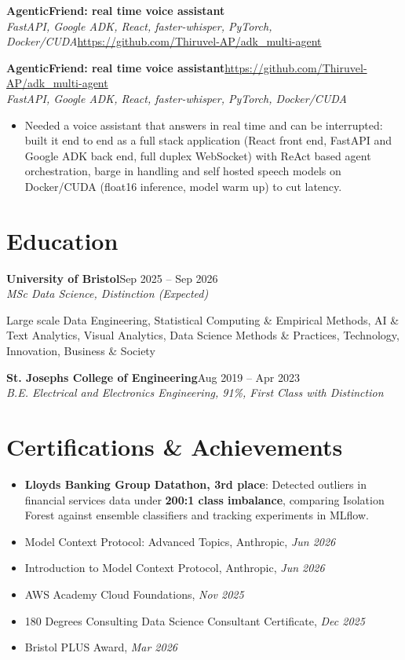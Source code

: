 \documentclass[a4paper,11pt]{article}
\newcommand{\roleNoLoc}[3]{\textbf{#1}\hfill{\color{muted}#2}\\ \textit{#3}\par}
\newcommand{\project}[3]{%
  \textbf{#1}\hfill#3\\ {\color{muted}\small\textit{#2}}\par}
\newcommand{\gap}{\vspace{5pt}}
\newcommand{\num}[1]{\textbf{#1}}   %
\begin{document}
\else
\textbf{AgenticFriend: real time voice assistant}\\ {\color{muted}\small\textit{FastAPI, Google ADK, React, faster-whisper, PyTorch, Docker/CUDA}}\hfill{\small\url{https://github.com/Thiruvel-AP/adk_multi-agent}}\par
\fi
\else
\project{AgenticFriend: real time voice assistant}{FastAPI, Google ADK, React, faster-whisper, PyTorch, Docker/CUDA}{\url{https://github.com/Thiruvel-AP/adk_multi-agent}}
\fi
\begin{itemize}
  \item Needed a voice assistant that answers in real time and can be interrupted: built it end to end as a full stack application (React front end, FastAPI and Google ADK back end, full duplex WebSocket) with ReAct based agent orchestration, barge in handling and self hosted speech models on Docker/CUDA (float16 inference, model warm up) to cut latency.
\end{itemize}

\section{Education}
\roleNoLoc{University of Bristol}{Sep 2025 – Sep 2026}{MSc Data Science, Distinction \textit{(Expected)}}
{\color{muted}\small Large scale Data Engineering, Statistical Computing \& Empirical Methods, AI \& Text Analytics, Visual Analytics, Data Science Methods \& Practices, Technology, Innovation, Business \& Society}\par
\gap
{}
\roleNoLoc{St. Joseph\textquotesingle{}s College of Engineering}{Aug 2019 – Apr 2023}{B.E. Electrical and Electronics Engineering, 91\%, First Class with Distinction}

\section{Certifications \& Achievements}
\begin{itemize}
  \item \textbf{Lloyd\textquotesingle{}s Banking Group Datathon, 3rd place}: Detected outliers in financial services data under \num{200:1 class imbalance}, comparing Isolation Forest against ensemble classifiers and tracking experiments in MLflow.
  \item Model Context Protocol: Advanced Topics, Anthropic, \textit{Jun 2026}
  \item Introduction to Model Context Protocol, Anthropic, \textit{Jun 2026}
  \item AWS Academy Cloud Foundations, \textit{Nov 2025}
  \item 180 Degrees Consulting Data Science Consultant Certificate, \textit{Dec 2025}
  \item Bristol PLUS Award, \textit{Mar 2026}
\end{itemize}
\end{document}
